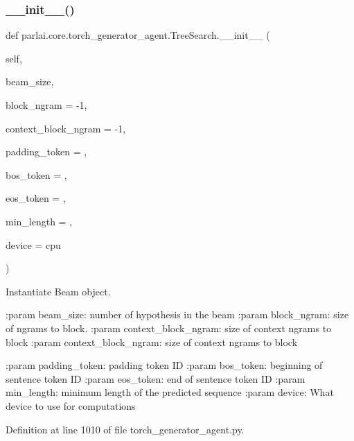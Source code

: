 \subsubsection{\texorpdfstring{\+\_\+\+\_\+init\+\_\+\+\_\+()}{\_\_init\_\_()}}
{\footnotesize\ttfamily def parlai.\+core.\+torch\+\_\+generator\+\_\+agent.\+Tree\+Search.\+\_\+\+\_\+init\+\_\+\+\_\+ (\begin{DoxyParamCaption}\item[{}]{self,  }\item[{}]{beam\+\_\+size,  }\item[{}]{block\+\_\+ngram = {\ttfamily -\/1},  }\item[{}]{context\+\_\+block\+\_\+ngram = {\ttfamily -\/1},  }\item[{}]{padding\+\_\+token = {},  }\item[{}]{bos\+\_\+token = {},  }\item[{}]{eos\+\_\+token = {},  }\item[{}]{min\+\_\+length = {},  }\item[{}]{device = {\ttfamily \textquotesingle{}cpu\textquotesingle{}} }\end{DoxyParamCaption})}

\begin{DoxyVerb}Instantiate Beam object.

:param beam_size:
    number of hypothesis in the beam
:param block_ngram:
    size of ngrams to block.
:param context_block_ngram:
    size of context ngrams to block
:param context_block_ngram:
    size of context ngrams to block

:param padding_token:
    padding token ID
:param bos_token:
    beginning of sentence token ID
:param eos_token:
    end of sentence token ID
:param min_length:
    minimum length of the predicted sequence
:param device:
    What device to use for computations
\end{DoxyVerb}
 

Definition at line 1010 of file torch\+\_\+generator\+\_\+agent.\+py.


